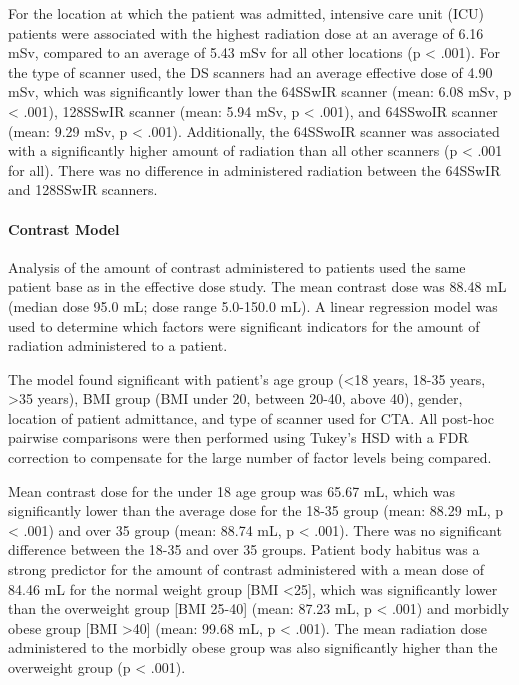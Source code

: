 \documentclass[]{article}
\let\oldparagraph\paragraph
\renewcommand{\paragraph}[1]{\oldparagraph{#1}\mbox{}}
\begin{document}
For the location at which the patient was admitted, intensive care unit
(ICU) patients were associated with the highest radiation dose at an
average of 6.16 mSv, compared to an average of 5.43 mSv for all other
locations (p \textless{} .001). For the type of scanner used, the DS
scanners had an average effective dose of 4.90 mSv, which was
significantly lower than the 64SSwIR scanner (mean: 6.08 mSv, p
\textless{} .001), 128SSwIR scanner (mean: 5.94 mSv, p \textless{}
.001), and 64SSwoIR scanner (mean: 9.29 mSv, p \textless{} .001).
Additionally, the 64SSwoIR scanner was associated with a significantly
higher amount of radiation than all other scanners (p \textless{} .001
for all). There was no difference in administered radiation between the
64SSwIR and 128SSwIR scanners.

\newpage

\paragraph{Contrast Model}\label{contrast-model-1}

Analysis of the amount of contrast administered to patients used the
same patient base as in the effective dose study. The mean contrast dose
was 88.48 mL (median dose 95.0 mL; dose range 5.0-150.0 mL). A linear
regression model was used to determine which factors were significant
indicators for the amount of radiation administered to a patient.

The model found significant with patient's age group (\textless{}18
years, 18-35 years, \textgreater{}35 years), BMI group (BMI under 20,
between 20-40, above 40), gender, location of patient admittance, and
type of scanner used for CTA. All post-hoc pairwise comparisons were
then performed using Tukey's HSD with a FDR correction to compensate for
the large number of factor levels being compared.

Mean contrast dose for the under 18 age group was 65.67 mL, which was
significantly lower than the average dose for the 18-35 group (mean:
88.29 mL, p \textless{} .001) and over 35 group (mean: 88.74 mL, p
\textless{} .001). There was no significant difference between the 18-35
and over 35 groups. Patient body habitus was a strong predictor for the
amount of contrast administered with a mean dose of 84.46 mL for the
normal weight group {[}BMI \textless{}25{]}, which was significantly
lower than the overweight group {[}BMI 25-40{]} (mean: 87.23 mL, p
\textless{} .001) and morbidly obese group {[}BMI \textgreater{}40{]}
(mean: 99.68 mL, p \textless{} .001). The mean radiation dose
administered to the morbidly obese group was also significantly higher
than the overweight group (p \textless{} .001).
\end{document}

